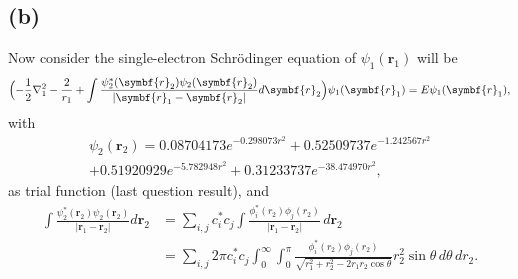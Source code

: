 \documentclass[12pt]{article}
\begin{document}

\subsection*{(b)}

Now consider the single-electron Schrödinger equation of $\psi_1(\symbf{r}_1)$ will be
%
\begin{equation}
    \Bigl(
    -\frac{1}{2}\nabla_1^2 - \frac{2}{r_1} + \int
    \frac{\psi_2^\ast(\symbf{r}_2)\psi_2(\symbf{r}_2)}{\lvert \symbf{r}_1 - \symbf{r}_2 \rvert} d\symbf{r}_2
    \Bigr)
    \psi_1(\symbf{r}_1) = E \psi_1 (\symbf{r}_1),
\end{equation}
%
with
%
\begin{multline}
    \psi_2(\symbf{r}_2) = 0.08704173 e^{-0.298073 r^2} + 0.52509737 e^{-1.242567 r^2}\\
    + 0.51920929 e^{-5.782948 r^2} + 0.31233737 e^{-38.474970 r^2},
\end{multline}
%
as trial function (last question result), and
%
\begin{equation}
    \begin{aligned}
        \int \frac{\psi_2^\ast(\symbf{r}_2)\psi_2(\symbf{r}_2)}{\lvert \symbf{r}_1 - \symbf{r}_2 \rvert} d\symbf{r}_2
         & = \sum_{i, j} c_i^\ast c_j \int
        \frac{\phi_i^\ast(r_2) \phi_j(r_2)}{\lvert \symbf{r}_1 - \symbf{r}_2 \rvert} \, d\symbf{r}_2 \\
         & = \sum_{i, j} 2\pi c_i^\ast c_j \int_{0}^{\infty} \int_{0}^{\pi}
        \tfrac{\phi_i^\ast(r_2) \phi_j(r_2)}{\sqrt{r_1^2 + r_2^2 - 2 r_1 r_2 \cos\theta}}
        r_2^2 \sin \theta\, d\theta\, dr_2.
    \end{aligned}
\end{equation}
\end{document}
